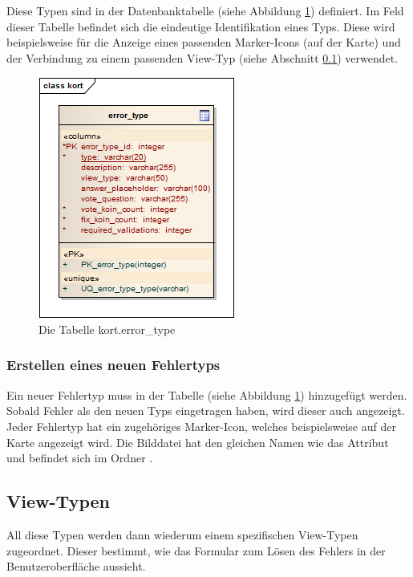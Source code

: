 Diese Typen sind in der Datenbanktabelle  (siehe Abbildung \ref{image-kort-database-table-error_type}) definiert.
Im Feld  dieser Tabelle befindet sich die eindeutige Identifikation eines Typs.
Diese wird beispielsweise für die Anzeige eines passenden Marker-Icons (auf der Karte) und der Verbindung zu einem passenden View-Typ (siehe Abschnitt \ref{view-types}) verwendet.

\begin{figure}[H]
	\centering
	\includegraphics[scale=0.7]{images/uml/kort-database-table-error_type}
	\caption{Die Tabelle kort.error\_type}
	\label{image-kort-database-table-error_type}
\end{figure}

\subsubsection{Erstellen eines neuen Fehlertyps}
\label{create-new-error-type}
Ein neuer Fehlertyp muss in der Tabelle  (siehe Abbildung \ref{image-kort-database-table-error_type}) hinzugefügt werden.
Sobald Fehler als  den neuen Typs eingetragen haben, wird dieser auch angezeigt.
Jeder Fehlertyp hat ein zugehöriges Marker-Icon, welches beispielsweise auf der Karte angezeigt wird.
Die Bilddatei hat den gleichen Namen wie das Attribut  und befindet sich im Ordner .

\subsection{View-Typen}
\label{view-types}
All diese Typen werden dann wiederum einem spezifischen View-Typen zugeordnet.
Dieser bestimmt, wie das Formular zum Lösen des Fehlers in der Benutzeroberfläche aussieht.

